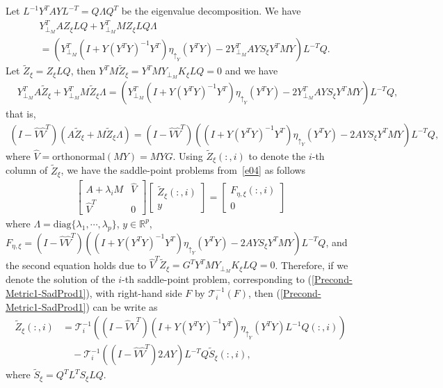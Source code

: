 \documentclass[11pt]{article}
\numberwithin{equation}{section}
\begin{document}
Let $L^{-1}Y^TAYL^{-T}=Q\Lambda Q^T$ be the eigenvalue decomposition. We have 
 \begin{align*} 
  &Y_{\perp_M}^T AZ_\xi LQ+Y_{\perp_M}^TMZ_\xi LQ\Lambda  \\
  & = (Y_{\perp_M}^T(I+Y(Y^TY)^{-1}Y^T)\eta_{\uparrow_Y}(Y^TY)-2Y_{\perp_M}^TAYS_\xi Y^TMY)L^{-T}Q. 
  \end{align*}
 Let $\tilde{Z}_\xi=Z_\xi LQ$, then $Y^TM\tilde{Z}_\xi=Y^TMY_{\perp_M} K_\xi LQ=0$ and we have
  \begin{align*} 
    & Y_{\perp_M}^TA\tilde{Z}_\xi + Y_{\perp_M}^T M\tilde{Z}_\xi\Lambda = (Y_{\perp_M}^T(I+Y(Y^TY)^{-1}Y^T)\eta_{\uparrow_Y}(Y^TY)-2Y_{\perp_M}^TAYS_\xi Y^TMY)L^{-T}Q,
  \end{align*} 
that is, 
\begin{align} \label{e04}
  (I-\hat{V}\hat{V}^T)(A\tilde{Z}_\xi+M\tilde{Z}_\xi\Lambda)=(I-\hat{V}\hat{V}^T)((I+Y(Y^TY)^{-1}Y^T)\eta_{\uparrow_Y}(Y^TY)-2AYS_\xi Y^TMY)L^{-T}Q, 
\end{align}
where $\hat{V}=\mathrm{orthonormal}(MY)=MYG$.
Using $\tilde{Z}_\xi(:,i)$ to denote the $i$-th column of $\tilde{Z}_\xi$, we have the saddle-point problems from~\eqref{e04} as follows 
\begin{equation}
  \begin{aligned} \label{Precond-Metric1-SadProd1}    
    \begin{bmatrix} A+\lambda_iM &\hat{V}\\ \hat{V}^T & 0 \end{bmatrix} \begin{bmatrix} \tilde{Z}_\xi(:,i)\\y\end{bmatrix}=\begin{bmatrix} F_{\eta,\xi}(:,i) \\ 0 \end{bmatrix}
  \end{aligned}
\end{equation}
where $\Lambda = \mathrm{diag}\{\lambda_1,\cdots,\lambda_p\}$, $y\in\mathbb{R}^p$, $F_{\eta,\xi}=(I-\hat{V}\hat{V}^T)((I+Y(Y^TY)^{-1}Y^T)\eta_{\uparrow_Y}(Y^TY)-2AYS_\xi Y^TMY)L^{-T}Q$, and the second equation holds due to $\hat{V}^T\tilde{Z}_\xi=G^TY^TMY_{\perp_M} K_\xi LQ=0$. Therefore, if we denote the solution of the $i$-th saddle-point problem, corresponding to (\ref{Precond-Metric1-SadProd1}), with right-hand side $F$ by $\mathcal{T}_i^{-1}(F)$, then (\ref{Precond-Metric1-SadProd1}) can be write as 
\begin{equation}
  \begin{aligned} \label{Precond-Metric1-SadProdSol}
    \tilde{Z}_\xi(:,i) &=\mathcal{T}_i^{-1}\left((I-\hat{V}\hat{V}^T)(I+Y(Y^TY)^{-1}Y^T)\eta_{\uparrow_Y}(Y^TY)L^{-1}Q(:,i)\right) \\ 
    & \quad - \mathcal{T}_i^{-1}\left((I-\hat{V}\hat{V}^T)2AY\right)L^{-T}Q\tilde{S}_\xi(:,i),
  \end{aligned}
\end{equation}
where $\tilde{S}_\xi=Q^TL^TS_\xi LQ$. 
\end{document}
